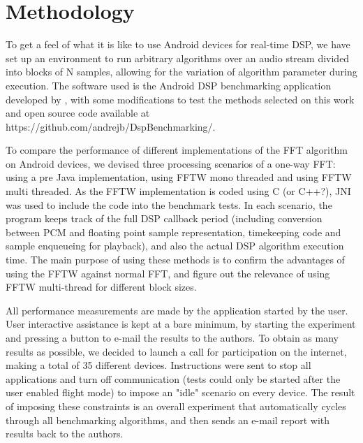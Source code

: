 \documentclass[12pt]{article}
\begin{document}
\section{Methodology}

To  get a feel of what it is like to use Android devices for real-time DSP, we
have set up an environment to run arbitrary algorithms over an audio stream
divided into blocks of N samples, allowing for the variation of algorithm
parameter during execution. The software used is the Android DSP benchmarking application
developed by \cite{ajbmqzSMC2012}, with some modifications to test
the methods selected on this work and open source code available at
https://github.com/andrejb/DspBenchmarking/.


To compare the performance of different implementations of the FFT algorithm
on Android devices, we devised three processing scenarios of a one-way FFT: using a pre Java implementation, using FFTW mono threaded and using FFTW multi threaded.
As the FFTW  implementation is coded using C (or C++?), JNI was used to include the
code into the benchmark tests. In each scenario, the program keeps track  of
the full DSP callback period (including conversion between PCM and  floating
point sample representation, timekeeping code and sample enqueueing for playback),
and also the actual DSP algorithm execution time. The  main purpose of using
these methods is to confirm the advantages of  using the FFTW against normal
FFT, and figure out the relevance of using  FFTW multi-thread for different
block sizes.

All  performance measurements are made by the application started by the
user. User interactive assistance is kept at a bare minimum, by starting  the
experiment and pressing a button to e-mail the results to the  authors. To
obtain as many results as possible, we decided to launch a  call for
participation on the internet, making a total of 35 different  devices.
Instructions were sent to stop all applications and turn off communication
(tests could only be started after the user enabled flight mode) to impose an
"idle" scenario on every device. The result of imposing these  constraints is
an overall experiment that automatically cycles through all benchmarking
algorithms, and then sends an e-mail report with results back to the authors.
\end{document}

